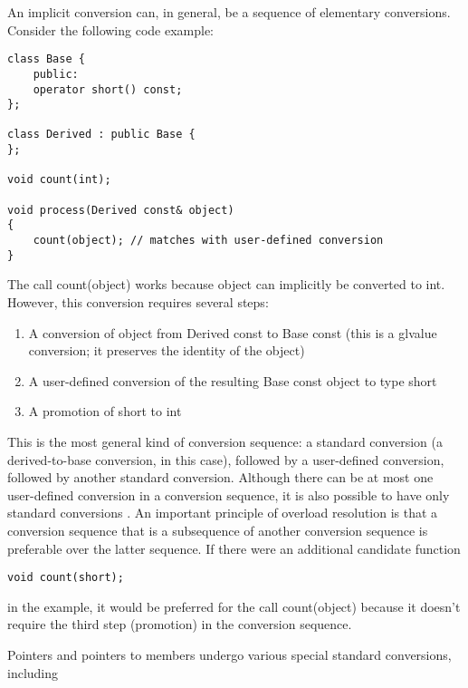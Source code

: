 An implicit conversion can, in general, be a sequence of elementary conversions. Consider the following code example:

\begin{lstlisting}[style=styleCXX]
class Base {
	public:
	operator short() const;
};

class Derived : public Base {
};

void count(int);

void process(Derived const& object)
{
	count(object); // matches with user-defined conversion
}
\end{lstlisting}

The call count(object) works because object can implicitly be converted to int. However, this conversion requires several steps:

\begin{enumerate}
\item 
 A conversion of object from Derived const to Base const (this is a glvalue conversion; it preserves the identity of the object)

\item 
A user-defined conversion of the resulting Base const object to type short

\item 
A promotion of short to int
\end{enumerate}

This is the most general kind of conversion sequence: a standard conversion (a derived-to-base conversion, in this case), followed by a user-defined conversion, followed by another standard conversion. Although there can be at most one user-defined conversion in a conversion sequence, it is also possible to have only standard conversions
.
An important principle of overload resolution is that a conversion sequence that is a subsequence of another conversion sequence is preferable over the latter sequence. If there were an additional candidate function

\begin{lstlisting}[style=styleCXX]
void count(short);
\end{lstlisting}

in the example, it would be preferred for the call count(object) because it doesn’t require the third step (promotion) in the conversion sequence.


Pointers and pointers to members undergo various special standard conversions, including

